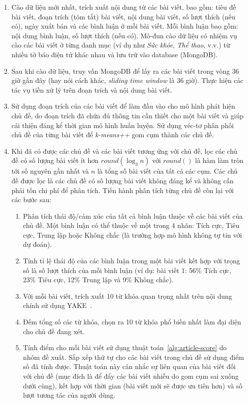 \begin{enumerate}
    \item Cào dữ liệu mới nhất, trích xuất nội dung từ các bài viết, bao gồm: tiêu đề bài viết, đoạn trích (tóm tắt) bài viết, nội dung bài viết, số lượt thích (nếu có), ngày xuất bản và các bình luận ở mỗi bài viết. Mỗi bình luận bao gồm: nội dung bình luận, số lượt thích (nếu có). Mô-đun cào dữ liệu có nhiệm vụ cào các bài viết ở từng danh mục (ví dụ như \textit{Sức khỏe}, \textit{Thể thao}, v.v.) từ nhiều tờ báo điện tử khác nhau và lưu trữ vào database (MongoDB).
    \item Sau khi cào dữ liệu, truy vấn MongoDB để lấy ra các bài viết trong vòng 36 giờ gần đây (hay nói cách khác, \textit{sliding time window} là 36 giờ). Thực hiện các tác vụ tiền xử lý trên đoạn trích và nội dung bài viết.
    \item Sử dụng đoạn trích của các bài viết để làm đầu vào cho mô hình phát hiện chủ đề, do đoạn trích đã chứa đủ thông tin cần thiết cho một bài viết và giúp cải thiện đáng kể thời gian mô hình huấn luyện. Sử dụng véc-tơ phân phối chủ đề của từng bài viết để \textit{k-means++} gom cụm thành các chủ đề.
    \item Khi đã có được các chủ đề và các bài viết tương ứng với chủ đề, lọc các chủ đề có số lượng bài viết ít hơn $round(\log_{3}n)$ với $round()$ là hàm làm tròn tới số nguyên gần nhất và $n$ là tổng số bài viết của tất cả các cụm. Các chủ đề được lọc là các chủ đề có số lượng bài viết không đáng kể và không cần phải tốn chi phí để phân tích. Tiến hành phân tích từng chủ đề còn lại với các bước sau:
    \begin{enumerate}
        \item Phân tích thái độ/cảm xúc của tất cả bình luận thuộc về các bài viết của chủ đề. Một bình luận có thể thuộc về một trong 4 nhãn: Tích cực, Tiêu cực, Trung lập hoặc Không chắc (là trường hợp mô hình không tự tin với dự đoán).
        \item Tính tỉ lệ thái độ của các bình luận trong một bài viết kết hợp với trọng số là số lượt thích của mỗi bình luận (ví dụ: bài viết 1: 56\% Tích cực, 23\% Tiêu cực, 12\% Trung lập và 9\% Không chắc).
        \item Với mỗi bài viết, trích xuất 10 từ khóa quan trọng nhất trên nội dung chính sử dụng YAKE~\cite{camposYAKEKeywordExtraction2020}.
        \item Đếm tổng số các từ khóa, chọn ra 10 từ khóa phổ biến nhất làm đại diện cho chủ đề đang xét.
        \item Tính điểm cho mỗi bài viết sử dụng thuật toán~\ref{alg:article-score} do nhóm đề xuất. Sắp xếp thứ tự cho các bài viết trong chủ đề sử dụng điểm số đã tính được. Thuật toán này cân nhắc sự liên quan của bài viết đối với chủ đề (mục đích là để đẩy các bài viết nhiễu do gom cụm sai xuống dưới cùng), kết hợp với thời gian (bài viết mới sẽ được ưu tiên hơn) và số lượt tương tác của người dùng.

\end{enumerate}
\end{enumerate}
